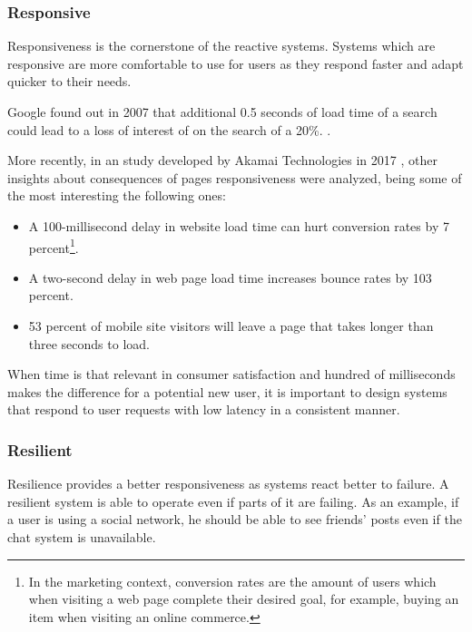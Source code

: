 \documentclass[../main.tex]{subfiles}
\begin{document}
\subsubsection{Responsive}

Responsiveness is the cornerstone of the reactive
systems. Systems which are responsive are more comfortable to use for users as
they respond faster and adapt quicker to their needs.

Google found out in 2007 that additional 0.5 seconds of load time of a search
could lead to a loss of interest of on the search of a 20\%. \autocite{MayerGoogleYouTube}.

More recently, in an study developed by Akamai Technologies in 2017 \autocite{Akamai2017TheAkamai}, other
insights about consequences of pages responsiveness were analyzed, being some of the most
interesting the following ones:

\begin{itemize}
    \item A 100-millisecond delay in website load time can hurt conversion rates
by 7 percent\footnote{In the marketing context, conversion rates are the amount of users
    which when visiting a web page complete their desired goal, for example, buying an item
    when visiting an online commerce.}.

    \item A two-second delay in web page load time increases bounce rates by 103
percent.

    \item 53 percent of mobile site visitors will leave a page that takes longer
than three seconds to load.
\end{itemize}

When time is that relevant in consumer satisfaction and hundred of milliseconds
makes the difference for a potential new user, it is important to design systems
that respond to user requests with low latency in a consistent manner.

\subsubsection{Resilient}

Resilience provides a better responsiveness as systems
react better to failure. A resilient system is able to operate even if parts of
it are failing. As an example, if a user is using a social network, he should be
able to see friends' posts even if the chat system is unavailable.
\end{document}
